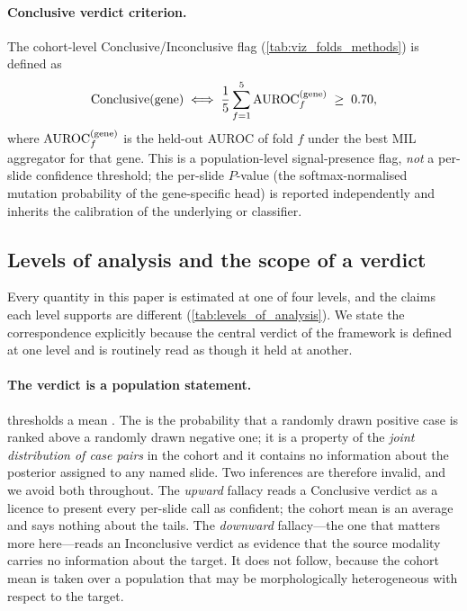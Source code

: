 \paragraph{Conclusive verdict criterion.}
The cohort-level Conclusive/Inconclusive flag
(\cref{tab:viz_folds_methods}) is defined as
\begin{equation}
\mathrm{Conclusive}(\mathrm{gene}) \iff
\frac{1}{5}\sum_{f=1}^{5}\text{AUROC}_{f}^{(\mathrm{gene})} \;\geq\; 0.70,
\label{eq:conclusive_verdict}
\end{equation}
where $\text{AUROC}_f^{(\mathrm{gene})}$ is the held-out AUROC of fold $f$
under the best MIL aggregator for that gene.
This is a population-level signal-presence flag, \emph{not} a
per-slide confidence threshold; the per-slide $P$-value (the
softmax-normalised mutation probability of the gene-specific head)
is reported independently and inherits the calibration of the
underlying \piabmil{} or \fcmil{} classifier.

\subsection*{Levels of analysis and the scope of a verdict}

Every quantity in this paper is estimated at one of four levels, and
the claims each level supports are different
(\cref{tab:levels_of_analysis}).
We state the correspondence explicitly because the central verdict of
the framework is defined at one level and is routinely read as though
it held at another.

\paragraph{The verdict is a population statement.}
 thresholds a mean \auroc{}.
The \auroc{} is the probability that a randomly drawn positive case
is ranked above a randomly drawn negative one; it is a property of
the \emph{joint distribution of case pairs} in the cohort and it
contains no information about the posterior assigned to any named
slide.
Two inferences are therefore invalid, and we avoid both throughout.
The \emph{upward} fallacy reads a Conclusive verdict as a licence to
present every per-slide call as confident; the cohort mean is an
average and says nothing about the tails.
The \emph{downward} fallacy---the one that matters more here---reads
an Inconclusive verdict as evidence that the source modality carries
no information about the target.
It does not follow, because the cohort mean is taken over a
population that may be morphologically heterogeneous with respect to
the target.

